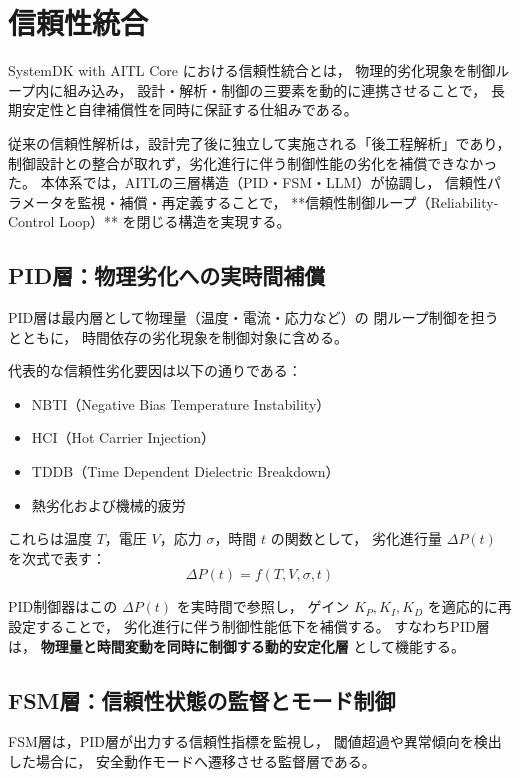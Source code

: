 \section{信頼性統合}

SystemDK with AITL Core における信頼性統合とは，
物理的劣化現象を制御ループ内に組み込み，
設計・解析・制御の三要素を動的に連携させることで，
長期安定性と自律補償性を同時に保証する仕組みである。

従来の信頼性解析は，設計完了後に独立して実施される「後工程解析」であり，
制御設計との整合が取れず，劣化進行に伴う制御性能の劣化を補償できなかった。
本体系では，AITLの三層構造（PID・FSM・LLM）が協調し，
信頼性パラメータを監視・補償・再定義することで，
**信頼性制御ループ（Reliability-Control Loop）** を閉じる構造を実現する。

\subsection{PID層：物理劣化への実時間補償}
PID層は最内層として物理量（温度・電流・応力など）の
閉ループ制御を担うとともに，
時間依存の劣化現象を制御対象に含める。

代表的な信頼性劣化要因は以下の通りである：
\begin{itemize}
  \item NBTI（Negative Bias Temperature Instability）
  \item HCI（Hot Carrier Injection）
  \item TDDB（Time Dependent Dielectric Breakdown）
  \item 熱劣化および機械的疲労
\end{itemize}

これらは温度 $T$，電圧 $V$，応力 $\sigma$，時間 $t$ の関数として，
劣化進行量 $\Delta P(t)$ を次式で表す：
\begin{equation}
\Delta P(t) = f(T, V, \sigma, t)
\end{equation}

PID制御器はこの $\Delta P(t)$ を実時間で参照し，
ゲイン $K_P, K_I, K_D$ を適応的に再設定することで，
劣化進行に伴う制御性能低下を補償する。
すなわちPID層は，
\textbf{物理量と時間変動を同時に制御する動的安定化層}
として機能する。

\subsection{FSM層：信頼性状態の監督とモード制御}
FSM層は，PID層が出力する信頼性指標を監視し，
閾値超過や異常傾向を検出した場合に，
安全動作モードへ遷移させる監督層である。

